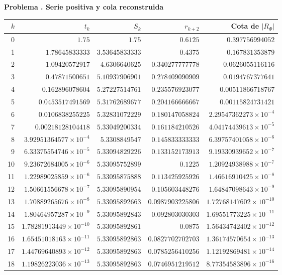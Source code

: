 \documentclass[11pt,a4paper]{article}
\theoremstyle{definition}
\newcounter{problema}
\newenvironment{resuelto}[1]{\refstepcounter{problema}\par\medskip\Needspace{6\baselineskip}\textbf{Problema \theproblema. #1}\par}{\par\medskip}
\begin{document}
\begin{resuelto}{Serie positiva y cola reconstruida}
\begin{center}\small\begin{tabular}{rrrrr}
\toprule
$k$&$t_k$&$S_k$&$r_{k+2}$&Cota de $|R_\Phi|$\\
\midrule
0&$1.75$&$1.75$&$0.6125$&$0.397756994052$\\
1&$1.78645833333$&$3.53645833333$&$0.4375$&$0.167831353879$\\
2&$1.09420572917$&$4.6306640625$&$0.340277777778$&$0.0626055116116$\\
3&$0.47871500651$&$5.10937906901$&$0.278409090909$&$0.0194767377641$\\
4&$0.162896078604$&$5.27227514761$&$0.235576923077$&$0.00511866718767$\\
5&$0.0453517491569$&$5.31762689677$&$0.204166666667$&$0.00115824731421$\\
6&$0.0106838255225$&$5.32831072229$&$0.180147058824$&$2.29547362273\times10^{-4}$\\
7&$0.00218128104418$&$5.33049200334$&$0.161184210526$&$4.04174439613\times10^{-5}$\\
8&$3.92951364577\times10^{-4}$&$5.3308849547$&$0.145833333333$&$6.39757401058\times10^{-6}$\\
9&$6.33375554746\times10^{-5}$&$5.33094829226$&$0.133152173913$&$9.19330939652\times10^{-7}$\\
10&$9.23672684005\times10^{-6}$&$5.33095752899$&$0.1225$&$1.20924938988\times10^{-7}$\\
11&$1.22989025859\times10^{-6}$&$5.33095875888$&$0.113425925926$&$1.46616910425\times10^{-8}$\\
12&$1.50661556678\times10^{-7}$&$5.33095890954$&$0.105603448276$&$1.64847098643\times10^{-9}$\\
13&$1.70889265676\times10^{-8}$&$5.33095892663$&$0.0987903225806$&$1.72768147602\times10^{-10}$\\
14&$1.80464957287\times10^{-9}$&$5.33095892843$&$0.092803030303$&$1.69551773225\times10^{-11}$\\
15&$1.78281913449\times10^{-10}$&$5.33095892861$&$0.0875$&$1.56434742402\times10^{-12}$\\
16&$1.65451018163\times10^{-11}$&$5.33095892863$&$0.0827702702703$&$1.36174570654\times10^{-13}$\\
17&$1.44769640893\times10^{-12}$&$5.33095892863$&$0.0785256410256$&$1.12192869481\times10^{-14}$\\
18&$1.19826223036\times10^{-13}$&$5.33095892863$&$0.0746951219512$&$8.77354583896\times10^{-16}$\\

\end{tabular}
\end{center}
\end{resuelto}
\end{document}
